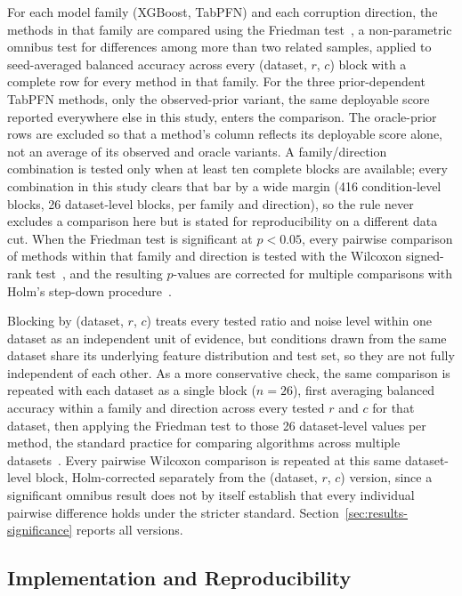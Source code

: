 For each model family (XGBoost, TabPFN) and each corruption direction, the
methods in that family are compared using the Friedman
test~\cite{friedman1937ranks}, a non-parametric omnibus test for differences
among more than two related samples, applied to seed-averaged balanced
accuracy across every (dataset, $r$, $c$) block with a complete row for every
method in that family. For the three prior-dependent TabPFN methods, only
the observed-prior variant, the same deployable score reported everywhere
else in this study, enters the comparison. The oracle-prior rows are
excluded so that a method's column reflects its deployable score alone, not
an average of its observed and oracle variants. A family/direction
combination is tested only when at least ten complete blocks are
available; every combination in this study clears that bar by a wide
margin (416 condition-level blocks, 26 dataset-level blocks, per
family and direction), so the rule never excludes a comparison here but
is stated for reproducibility on a different data cut. When
the Friedman test is
significant at $p<0.05$, every pairwise comparison of methods within that
family and direction is tested with the Wilcoxon signed-rank
test~\cite{wilcoxon1945ranking}, and the resulting $p$-values are corrected
for multiple comparisons with Holm's step-down
procedure~\cite{holm1979sequential}.

Blocking by (dataset, $r$, $c$) treats every tested ratio and noise level
within one dataset as an independent unit of evidence, but conditions
drawn from the same dataset share its underlying feature distribution and
test set, so they are not fully independent of each other. As a more
conservative check, the same comparison is repeated with each dataset as
a single block ($n{=}26$), first averaging balanced accuracy within a
family and direction across every tested $r$ and $c$ for that dataset,
then applying the Friedman test to those 26 dataset-level values per
method, the standard practice for comparing algorithms across multiple
datasets~\cite{demsar2006statistical}. Every pairwise Wilcoxon comparison
is repeated at this same dataset-level block, Holm-corrected separately
from the (dataset, $r$, $c$) version, since a significant omnibus result
does not by itself establish that every individual pairwise difference
holds under the stricter standard. Section~\ref{sec:results-significance}
reports all versions.

\subsection{Implementation and Reproducibility}
\label{sec:methods-implementation}

